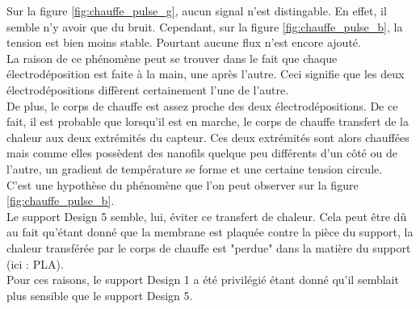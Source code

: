 Sur la figure \ref{fig:chauffe_pulse_g}, aucun signal n'est distingable. En effet, il semble n'y avoir que du bruit. Cependant, sur la figure
\ref{fig:chauffe_pulse_b}, la tension est bien moins stable. Pourtant aucune flux n'est encore ajouté. \\

La raison de ce phénomène peut se trouver dans le fait que chaque électrodéposition est faite à la main, une après l'autre. Ceci signifie que
les deux électrodépositions diffèrent certainement l'une de l'autre. \\
De plus, le corps de chauffe est assez proche des deux électrodépositions. De ce fait, il est probable que lorsqu'il est en marche, le corps de
chauffe transfert de la chaleur aux deux extrémités du capteur. Ces deux extrémités sont alors chauffées mais comme elles possèdent des nanofils
quelque peu différents d'un côté ou de l'autre, un gradient de température se forme et une certaine tension circule. \\
C'est une hypothèse du phénomène que l'on peut observer sur la figure \ref{fig:chauffe_pulse_b}.\\

Le support Design 5 semble, lui, éviter ce transfert de chaleur. Cela peut être dû au fait qu'étant donné que la membrane est plaquée contre
la pièce du support, la chaleur transférée par le corps de chauffe est "perdue" dans la matière du support (ici : PLA).\\

Pour ces raisons, le support Design 1 a été privilégié étant donné qu'il semblait plus sensible que le support Design 5.\\

